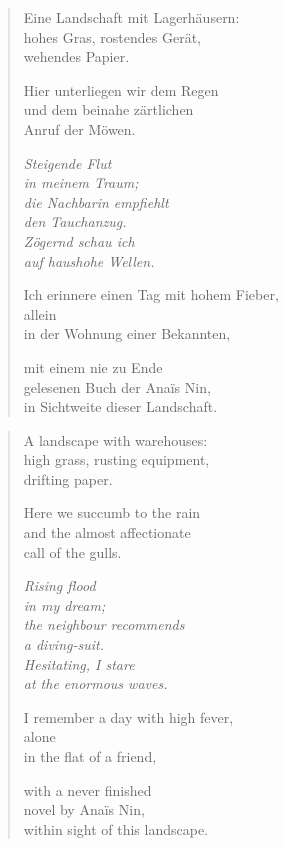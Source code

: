 
\cleartoverso


\begin{verse}

Eine Landschaft mit Lagerhäusern:\\
hohes Gras, rostendes Gerät,\\
wehendes Papier.

Hier unterliegen wir dem Regen\\
und dem beinahe zärtlichen\\
Anruf der Möwen.

{\itshape
Steigende Flut\\
in meinem Traum;\\
die Nachbarin empfiehlt\\
den Tauchanzug.\\
Zögernd schau ich\\
auf haushohe Wellen.}

Ich erinnere einen Tag mit hohem Fieber,\\
allein\\
in der Wohnung einer Bekannten,

mit einem nie zu Ende\\
gelesenen Buch der Anaïs Nin,\\
in Sichtweite dieser Landschaft.
\end{verse}

\clearpage


\begin{verse}

A landscape with warehouses:\\
high grass, rusting equipment,\\
drifting paper.

Here we succumb to the rain\\
and the almost affectionate\\
call of the gulls.

{\itshape
Rising flood\\
in my dream;\\
the neighbour recommends\\
a diving-suit.\\
Hesitating, I stare\\
at the enormous waves.}

I remember a day with high fever,\\
alone\\
in the flat of a friend,

with a never finished\\
novel by Anaïs Nin,\\
within sight of this landscape.
\end{verse}

